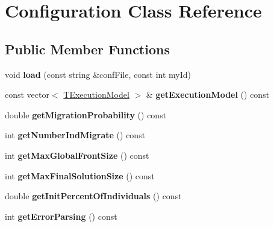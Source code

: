 \hypertarget{classConfiguration}{}\section{Configuration Class Reference}
\label{classConfiguration}
\subsection*{Public Member Functions}
\begin{DoxyCompactItemize}
\item 
\mbox{\label{classConfiguration_a8e99222735977ab3b8598c3a5ba9ba62}} 
void {\bfseries load} (const string \&conf\+File, const int my\+Id)
\item 
\mbox{\label{classConfiguration_abc913386d31aaef4abb45138227c3be7}} 
const vector$<$ \mbox{\hyperlink{structTExecutionModel}{T\+Execution\+Model}} $>$ \& {\bfseries get\+Execution\+Model} () const
\item 
\mbox{\label{classConfiguration_a1c718c61e4364df7a5634c0bf0e30398}} 
double {\bfseries get\+Migration\+Probability} () const
\item 
\mbox{\label{classConfiguration_ab9ab8d16beb8bcef640f7a4323098fef}} 
int {\bfseries get\+Number\+Ind\+Migrate} () const
\item 
\mbox{\label{classConfiguration_aada27d511cdf828029b7d9a254c4c728}} 
int {\bfseries get\+Max\+Global\+Front\+Size} () const
\item 
\mbox{\label{classConfiguration_aceb1ac4c4a6198a9f40e85cfe78d4cc7}} 
int {\bfseries get\+Max\+Final\+Solution\+Size} () const
\item 
\mbox{\label{classConfiguration_a8b86e113ff51b88ee21bba9126000839}} 
double {\bfseries get\+Init\+Percent\+Of\+Individuals} () const
\item 
\mbox{\label{classConfiguration_a13e0b2744f3704ea3bcd9b7eed949317}} 
int {\bfseries get\+Error\+Parsing} () const
\item 
\mbox{\label{classConfiguration_a8051c6488fcda0952e950be39833b7a2}} 

\end{DoxyCompactItemize}
